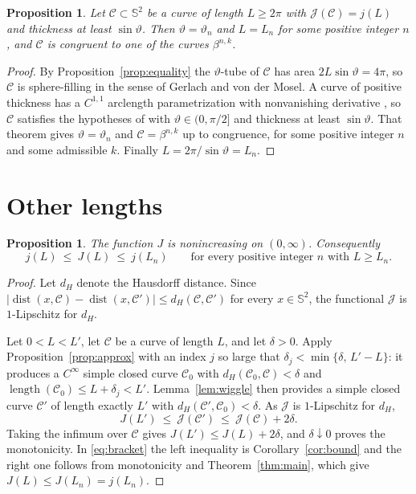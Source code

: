 \documentclass[11pt,oneside,reqno]{amsart}
\theoremstyle{plain}
\newtheorem{proposition}[theorem]{Proposition}
\theoremstyle{definition}
\DeclareMathOperator{\dist}{dist}
\DeclareMathOperator{\length}{length}
\newcommand{\Sph}{\mathbb{S}^{2}}
\newcommand{\bta}[2]{\beta^{#1,#2}}
\begin{document}
\begin{proposition}\label{prop:classify}
Let $\mathcal{C}\subset\Sph$ be a curve of length $L\ge2\pi$ with
$\mathcal{J}(\mathcal{C})=j(L)$ and thickness at least $\sin\vartheta$. Then
$\vartheta=\vartheta_{n}$ and $L=L_{n}$ for some positive integer $n$, and
$\mathcal{C}$ is congruent to one of the curves $\bta{n}{k}$.
\end{proposition}

\begin{proof}
By Proposition~\ref{prop:equality} the $\vartheta$-tube of $\mathcal{C}$ has
area $2L\sin\vartheta=4\pi$, so $\mathcal{C}$ is sphere-filling in the sense of
Gerlach and von der Mosel. A curve of positive thickness has a $C^{1,1}$ arclength parametrization with
nonvanishing derivative \cite[\S1]{GvdM2011b}, so $\mathcal{C}$ satisfies the
hypotheses of \cite[Thm.~4]{GvdM2011b} with $\vartheta\in(0,\pi/2]$ and
thickness at least $\sin\vartheta$. That theorem gives $\vartheta=\vartheta_{n}$ and
$\mathcal{C}=\bta{n}{k}$
up to congruence, for some positive integer $n$ and some admissible $k$. Finally
$L=2\pi/\sin\vartheta=L_{n}$.
\end{proof}

\section{Other lengths}\label{sec:other}

\begin{proposition}\label{prop:other}
The function $J$ is nonincreasing on $(0,\infty)$. Consequently
\begin{equation}\label{eq:bracket}
  j(L)\ \le\ J(L)\ \le\ j(L_{n})\qquad
  \text{for every positive integer }n\text{ with }L\ge L_{n}.
\end{equation}
\end{proposition}

\begin{proof}
Let $d_{H}$ denote the Hausdorff distance. Since
$\lvert\dist(x,\mathcal{C})-\dist(x,\mathcal{C}')\rvert
\le d_{H}(\mathcal{C},\mathcal{C}')$ for every $x\in\Sph$, the functional $\mathcal{J}$ is
$1$-Lipschitz for $d_{H}$.

Let $0<L<L'$, let $\mathcal{C}$ be a curve of length $L$, and let
$\delta>0$. Apply Proposition~\ref{prop:approx} with an index $j$ so large that
$\delta_{j}<\min\{\delta,\,L'-L\}$: it produces a $C^{\infty}$ simple closed
curve $\mathcal{C}_{0}$ with $d_{H}(\mathcal{C}_{0},\mathcal{C})<\delta$ and
$\length(\mathcal{C}_{0})\le L+\delta_{j}<L'$. Lemma~\ref{lem:wiggle} then provides a
simple closed curve $\mathcal{C}'$ of length exactly $L'$ with
$d_{H}(\mathcal{C}',\mathcal{C}_{0})<\delta$. As $\mathcal{J}$ is $1$-Lipschitz for
$d_{H}$,
\[
  J(L')\ \le\ \mathcal{J}(\mathcal{C}')\ \le\ \mathcal{J}(\mathcal{C})+2\delta .
\]
Taking the infimum over $\mathcal{C}$ gives
$J(L')\le J(L)+2\delta$, and $\delta\downarrow0$ proves the
monotonicity. In \eqref{eq:bracket} the left inequality is
Corollary~\ref{cor:bound} and the right one follows from monotonicity and
Theorem~\ref{thm:main}, which give $J(L)\le J(L_{n})=j(L_{n})$.
\end{proof}
\end{document}
